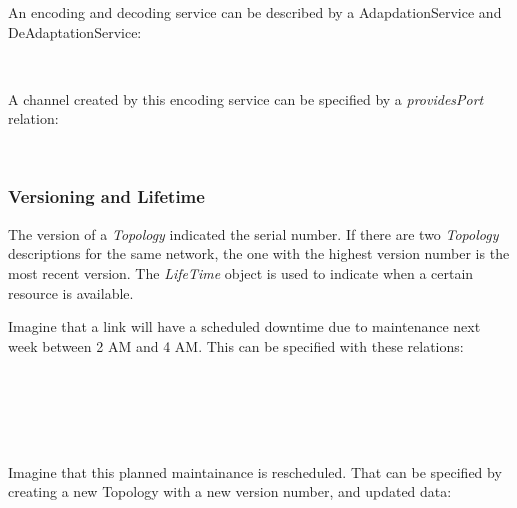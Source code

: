 An encoding and decoding service can be described by a AdapdationService and DeAdaptationService:

 \\

A channel created by this encoding service can be specified by a \emph{providesPort} relation:

 \\


\subsubsection{Versioning and Lifetime}

The version of a \emph{Topology} indicated the serial number. If there are two \emph{Topology} descriptions for the same network, the one with the highest version number is the most recent version. The \emph{LifeTime} object is used to indicate when a certain resource is available.

Imagine that a link will have a scheduled downtime due to maintenance next week between 2 AM and 4 AM. This can be specified with these relations:

 \\
 \\
 \\
 \\

Imagine that this planned maintainance is rescheduled. That can be specified by creating a new Topology with a new version number, and updated data:

 \\
 \\
 \\
 \\



